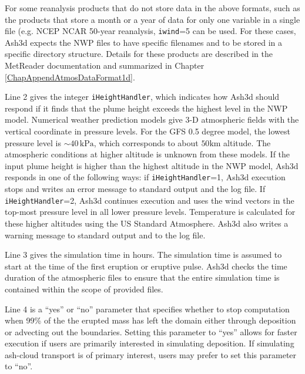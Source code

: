 For some reanalysis products that do not store data in the above formats, such as
the products that store a month or a year of data for only one variable in a single
file (e.g. NCEP NCAR 50-year reanalysis, \texttt{iwind}=5 can be used. For these cases,
Ash3d expects the NWP files to have specific filenames and to be stored in a
specific directory structure. Details for these products are described in the MetReader
documentation and summarized in Chapter \ref{ChapAppendAtmosDataFormat1d}.

Line 2 gives the integer \texttt{iHeightHandler}, which indicates how Ash3d should respond
if it finds that the plume height exceeds the highest level in the NWP model.
Numerical weather prediction models give 3-D atmospheric fields with the vertical coordinate
in pressure levels. For the GFS 0.5 degree model, the lowest pressure level is
$\sim 40 \,\mathrm{kPa}$,
which corresponds to about $50 \mathrm{km}$ altitude.
The atmospheric conditions at higher altitude is
unknown from these models. If the input plume height is higher than the highest
altitude in the NWP model, Ash3d responds in one of the following ways: if
\texttt{iHeightHandler}=1, Ash3d execution stops and writes an error message to standard output
and the log file.
If \texttt{iHeightHandler}=2, Ash3d continues execution and uses the wind vectors in the
top-most pressure level in all lower pressure levels. Temperature is calculated for these
higher altitudes using the US Standard Atmosphere. Ash3d also writes a warning
message to standard output and to the log file.

Line 3 gives the simulation time in hours. The simulation time is assumed to start
at the time of the first eruption or eruptive pulse. Ash3d checks the time duration
of the atmospheric files to ensure that the entire simulation time is contained within
the scope of provided files.

Line 4 is a ``yes'' or ``no'' parameter that specifies whether to stop computation
when 99\% of the the erupted mass has left the domain either through deposition or
advecting out the boundaries. Setting this parameter to ``yes''
allows for faster execution if users are primarily interested in simulating
deposition. If simulating ash-cloud transport is of primary interest, users may
prefer to set this parameter to ``no''.

